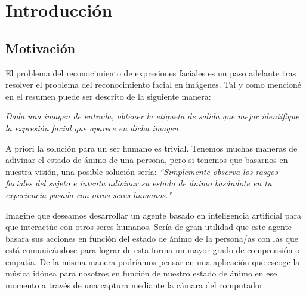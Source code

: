 \documentclass[a4paper,11pt]{book}
\begin{document}



%

%

\chapter{Introducción}


\section{Motivación}

El problema del reconocimiento de expresiones faciales es un paso adelante tras resolver el problema del reconocimiento facial en imágenes. Tal y como mencioné en el resumen puede ser descrito de la siguiente manera:
\begin{center}
	\textit{Dada una imagen de entrada, obtener la etiqueta de salida que mejor identifique la expresión facial que aparece en dicha imagen.}\\
\end{center}

A priori la solución para un ser humano es trivial. Tenemos muchas maneras de adivinar el estado de ánimo de una persona, pero si tenemos que basarnos en nuestra visión, una posible solución sería:
\textit{``Simplemente observa los rasgos faciales del sujeto e intenta adivinar su estado de ánimo basándote en tu experiencia pasada con otros seres humanos."\\}

Imagine que deseamos desarrollar un agente basado en inteligencia artificial para que interactúe con otros seres humanos. Sería de gran utilidad que este agente basara sus acciones en función del estado de ánimo de la persona/as con las que está comunicándose para lograr de esta forma un mayor grado de comprensión o empatía. De la misma manera podríamos pensar en una aplicación que escoge la música idónea para nosotros en función de nuestro estado de ánimo en ese momento a través de una captura mediante la cámara del computador.
\end{document}
